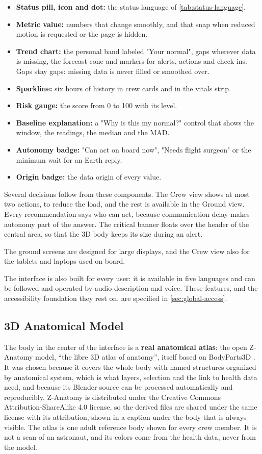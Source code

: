 \begin{itemize}
\item \textbf{Status pill, icon and dot:} the status language of \ref{tab:status-language}.
\item \textbf{Metric value:} numbers that change smoothly, and that snap when reduced motion is requested or the page is hidden.
\item \textbf{Trend chart:} the personal band labeled "Your normal", gaps wherever data is missing, the forecast cone and markers for alerts, actions and check-ins. Gaps stay gaps: missing data is never filled or smoothed over.
\item \textbf{Sparkline:} six hours of history in crew cards and in the vitals strip.
\item \textbf{Risk gauge:} the score from 0 to 100 with its level.
\item \textbf{Baseline explanation:} a "Why is this my normal?" control that shows the window, the readings, the median and the MAD.
\item \textbf{Autonomy badge:} "Can act on board now", "Needs flight surgeon" or the minimum wait for an Earth reply.
\item \textbf{Origin badge:} the data origin of every value.
\end{itemize}

Several decisions follow from these components. The Crew view shows at most two actions, to reduce the load, and the rest is available in the Ground view. Every recommendation says who can act, because communication delay makes autonomy part of the answer. The critical banner floats over the header of the central area, so that the 3D body keeps its size during an alert.

The ground screens are designed for large displays, and the Crew view also for the tablets and laptops used on board.

The interface is also built for every user: it is available in five languages and can be followed and operated by audio description and voice. These features, and the accessibility foundation they rest on, are specified in \ref{sec:global-access}.

\subsection{3D Anatomical Model}
\label{subsec:3d-model}

The body in the center of the interface is a \textbf{real anatomical atlas}: the open Z-Anatomy model, ``the libre 3D atlas of anatomy'', itself based on BodyParts3D \cite{z_anatomy}. It was chosen because it covers the whole body with named structures organized by anatomical system, which is what layers, selection and the link to health data need, and because its Blender source can be processed automatically and reproducibly. Z-Anatomy is distributed under the Creative Commons Attribution-ShareAlike 4.0 license, so the derived files are shared under the same license with its attribution, shown in a caption under the body that is always visible. The atlas is one adult reference body shown for every crew member. It is not a scan of an astronaut, and its colors come from the health data, never from the model.

